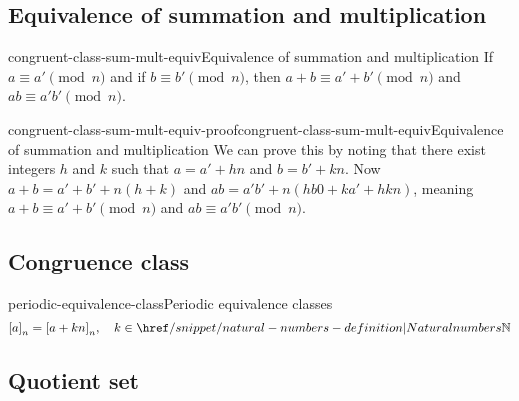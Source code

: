\documentclass[preview]{standalone}
\begin{document}
\subsection{Equivalence of summation and multiplication}

\begin{snippetproposition}{congruent-class-sum-mult-equiv}{Equivalence of summation and multiplication}
    If \(a \equiv a' \pmod{n}\) and if \(b \equiv b' \pmod{n}\), then
    \(a+b \equiv a' + b' \pmod{n}\) and \(ab \equiv a'b' \pmod{n}\).
\end{snippetproposition}

\begin{snippetproof}{congruent-class-sum-mult-equiv-proof}{congruent-class-sum-mult-equiv}{Equivalence of summation and multiplication}
    We can prove this by noting that there exist integers \(h\) and \(k\) such that
    \(a=a'+hn\) and \(b=b'+kn\).
    Now \(a+b = a'+b'+n(h+k)\) and \(ab=a'b' + n(hb0+ka'+hkn)\), meaning
    \(a+b \equiv a' + b' \pmod{n}\) and \(ab \equiv a'b' \pmod{n}\).
\end{snippetproof}

\subsection{Congruence class}


\begin{snippetproposition}{periodic-equivalence-class}{Periodic equivalence classes}
    \[
        {[a]}_n = {[a + kn]}_n,\quad k \in \naturalnumbers
    \]
\end{snippetproposition}

\subsection{Quotient set}

%
\end{document}
